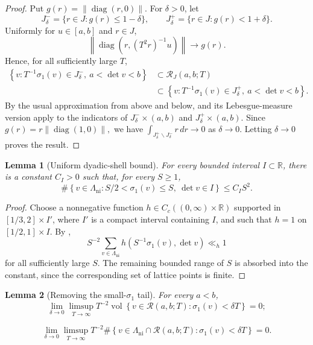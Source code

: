 \documentclass[reqno,11pt]{amsart}
\newtheorem{lem}[lem]{Lemma}
\theoremstyle{definition}
\theoremstyle{remark}
\numberwithin{equation}{section}
\newcommand{\vol}{\operatorname{vol}}
\begin{document}
\begin{proof}
Put
$
g(r)=\|\operatorname{diag}(r,0)\|.
$
For $\delta>0$, let
$$
J_\delta^-
=
\{r\in J:g(r)\le1-\delta\},
\qquad
J_\delta^+
=
\{r\in J:g(r)<1+\delta\}.
$$
Uniformly for $u\in[a,b]$ and $r\in J$,
$$
\left\|
\operatorname{diag}
\left(r, ({T^2r})^{-1}{u}\right)
\right\|
\to
g(r).
$$
Hence, for all sufficiently large $T$,
$$
\begin{aligned}
\left\{
v:
T^{-1}{\sigma_1(v)}\in J_\delta^-,
\ a<\det v<b
\right\}
&\subset
\mathcal R_J(a,b;T)\\
&\subset
\left\{
v: T^{-1} {\sigma_1(v)}\in J_\delta^+,
\ a<\det v<b
\right\}.
\end{aligned}
$$
By the usual approximation from above and below,
 and its Lebesgue-measure version apply to
the indicators of $J_\delta^-\times(a,b)$ and
$J_\delta^+\times(a,b)$. Since
$
g(r)=r\|\operatorname{diag}(1,0)\|,
$
we have
$
\int_{J_\delta^+\smallsetminus J_\delta^-}r\,dr
\to0
$
as $\delta\to0$. Letting $\delta\to0$ proves the result.
\end{proof}

\begin{lem}[Uniform dyadic-shell bound]
\label{lem:dyadic-shell-bound-d2}
For every bounded interval $I\subset\mathbb R$, there is a constant
$C_I>0$ such that, for every $S\ge1$,
$$
\#\left\{
v\in\Lambda_{\operatorname{ni}}:
{S}/{2}<\sigma_1(v)\le S,\ \det v\in I
\right\}
\le
C_IS^2.
$$
\end{lem}

\begin{proof}
Choose a nonnegative function
$h\in C_c((0,\infty)\times\mathbb R)$ supported in
$[1/3,2]\times I'$, where $I'$ is a compact interval containing $I$, and
such that $h=1$ on $[1/2,1]\times I$. By
,
$$
S^{-2}
\sum_{v\in\Lambda_{\operatorname{ni}}}
h\left(S^{-1}{\sigma_1(v)},\det v\right)
\ll_h1
$$
for all sufficiently large $S$. The remaining bounded range of $S$ is
absorbed into the constant, since the corresponding set of lattice points
is finite.
\end{proof}

\begin{lem}[Removing the small-$\sigma_1$ tail]
\label{lem:small-sigma-tail-d2}
For every $a<b$,
$$
\lim_{\delta\to0}
\limsup_{T\to\infty}
T^{-2}
\vol\left\{
v\in\mathcal R(a,b;T):
\sigma_1(v)<\delta T
\right\}
=
0;
$$

$$
\lim_{\delta\to0}
\limsup_{T\to\infty}
T^{-2}
\#\left\{
v\in\Lambda_{\operatorname{ni}}\cap\mathcal R(a,b;T):
\sigma_1(v)<\delta T
\right\}
=
0.
$$
\end{lem}
\end{document}
